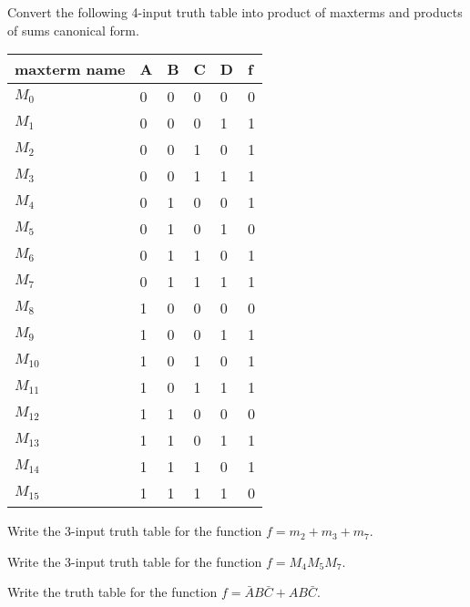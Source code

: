 \begin{prob}
  Convert the following 4-input truth table into product of maxterms and products of sums canonical form.

  \noindent
  \begin{tabular}{p{20mm}llll|l}
    \toprule
    maxterm name & A & B & C & D & f \\
    \midrule
    $M_0$ & 0 & 0 & 0 & 0 & 0 \\ 
    $M_1$ & 0 & 0 & 0 & 1 & 1 \\ 
    $M_2$ & 0 & 0 & 1 & 0 & 1 \\ 
    $M_3$ & 0 & 0 & 1 & 1 & 1 \\ 
    $M_4$ & 0 & 1 & 0 & 0 & 1 \\ 
    $M_5$ & 0 & 1 & 0 & 1 & 0 \\ 
    $M_6$ & 0 & 1 & 1 & 0 & 1 \\ 
    $M_7$ & 0 & 1 & 1 & 1 & 1 \\ 
    $M_8$ & 1 & 0 & 0 & 0 & 0 \\ 
    $M_9$ & 1 & 0 & 0 & 1 & 1 \\ 
    $M_{10}$ & 1 & 0 & 1 & 0 & 1 \\
    $M_{11}$ & 1 & 0 & 1 & 1 & 1 \\
    $M_{12}$ & 1 & 1 & 0 & 0 & 0 \\
    $M_{13}$ & 1 & 1 & 0 & 1 & 1 \\
    $M_{14}$ & 1 & 1 & 1 & 0 & 1 \\
    $M_{15}$ & 1 & 1 & 1 & 1 & 0 \\
    \bottomrule
  \end{tabular}
\end{prob}

\begin{example}
  Write the 3-input truth table for the function $f = m_2 + m_3 + m_7$.
\end{example}
\vspace{10em}

\begin{prob}
  Write the 3-input truth table for the function $f = M_4M_5M_7$. 
\end{prob}
\vspace{10em}

\begin{prob}
  Write the truth table for the function $f = \bar{A}B\bar{C} + AB\bar{C}$. 
\end{prob}
\vspace{10em}
